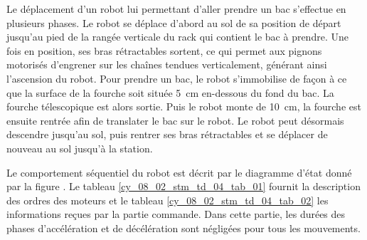 Le déplacement d'un robot lui permettant d'aller prendre un bac s'effectue en plusieurs phases. Le robot se déplace d'abord au sol de sa position de départ jusqu'au pied de la rangée verticale du rack qui contient le bac à prendre. Une fois en position, ses bras rétractables sortent, ce qui permet aux pignons motorisés d'engrener sur les chaînes tendues verticalement, générant ainsi l'ascension du robot. Pour prendre un bac, le robot s'immobilise de façon à ce que la surface de la fourche soit située \SI{5}{cm} en-dessous du fond du bac. La fourche télescopique est alors sortie. Puis le robot monte de \SI{10}{cm}, la fourche est ensuite rentrée afin de translater le bac sur le robot. Le robot peut désormais descendre jusqu'au sol, puis rentrer ses bras rétractables et se déplacer de nouveau au sol jusqu'à la station.

Le comportement séquentiel du robot est décrit par le diagramme d'état donné par la figure \label{Cy_08_02_STM_TD_04_dr_01}. Le tableau \ref{cy_08_02_stm_td_04_tab_01} fournit la description des ordres des moteurs et le tableau  \ref{cy_08_02_stm_td_04_tab_02} les informations reçues par la partie commande. Dans cette partie, les durées des phases d'accélération et de décélération sont négligées pour tous les mouvements.





